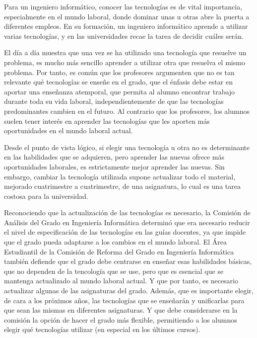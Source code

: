 Para un ingeniero informático,
conocer las tecnologías es de vital importancia,
especialmente en el mundo laboral,
donde dominar unas u otras abre la puerta a diferentes empleos.
En su formación,
un ingeniero informático aprende a utilizar varias tecnologías,
y en las universidades recae la tarea de decidir cuáles serán.

El día a día muestra que
una vez se ha utilizado una tecnología que resuelve un problema,
es mucho más sencillo aprender a utilizar otra que resuelva el mismo problema.
Por tanto, es común que los profesores argumenten que
no es tan relevante qué tecnologías se enseñe en el grado,
que el énfasis debe estar en aportar una enseñanza atemporal,
que permita al alumno encontrar trabajo durante toda su vida laboral,
independientemente de que las tecnologías predominantes cambien en el futuro.
Al contrario que los profesores,
los alumnos suelen tener interés en aprender las tecnologías que
les aporten más oportunidades en el mundo laboral actual.

Desde el punto de vista lógico,
si elegir una tecnología u otra no es determinante
en las habilidades que se adquieren,
pero aprender las nuevas ofrece más oportunidades laborales,
es estrictamente mejor aprender las nuevas.
Sin embargo, cambiar la tecnología utilizada
supone actualizar todo el material,
mejorado cuatrimestre a cuatrimestre,
de una asignatura,
lo cual es una tarea costosa para la universidad.

Reconociendo que la actualización de las tecnologías es necesario,
la Comisión de Análisis del Grado en Ingeniería Informática
determinó que era necesario
reducir el nivel de especificación de las tecnologías en las guías docentes,
ya que impide que el grado pueda adaptarse a los cambios en el mundo laboral.
El Área Estudiantil de
la Comisión de Reforma del Grado en Ingeniería Informática
también defiende que
el grado debe centrarse en enseñar esas habilidades básicas,
que no dependen de la tencología que se use,
pero que es esencial que se mantenga actualizado al mundo laboral actual.
Y que por tanto, es necesario actualizar algunas de las asignaturas del grado.
Además, que es importante elegir, de cara a los próximos años,
las tecnologías que se enseñarán y unificarlas para que
sean las mismas en diferentes asignaturas.
Y que debe considerarse en la comisión la opción de hacer el grado más flexible,
permitiendo a los alumnos elegir qué tecnologías utilizar
(en especial en los últimos cursos).


